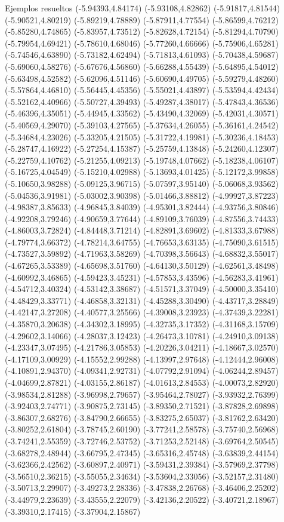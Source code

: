 \documentclass[11pt,a4paper]{article}
\begin{document}
\begin{fmex}{Ejemplos resueltos}
(-5.94393,4.84174) (-5.93108,4.82862) (-5.91817,4.81544) (-5.90521,4.80219) (-5.89219,4.78889) (-5.87911,4.77554) (-5.86599,4.76212) (-5.85280,4.74865) (-5.83957,4.73512) (-5.82628,4.72154) (-5.81294,4.70790) (-5.79954,4.69421) (-5.78610,4.68046) (-5.77260,4.66666) (-5.75906,4.65281) (-5.74546,4.63890) (-5.73182,4.62494) (-5.71813,4.61093) (-5.70438,4.59687) (-5.69060,4.58276) (-5.67676,4.56860) (-5.66288,4.55439) (-5.64895,4.54012) (-5.63498,4.52582) (-5.62096,4.51146) (-5.60690,4.49705) (-5.59279,4.48260) (-5.57864,4.46810) (-5.56445,4.45356) (-5.55021,4.43897) (-5.53594,4.42434) (-5.52162,4.40966) (-5.50727,4.39493) (-5.49287,4.38017) (-5.47843,4.36536) (-5.46396,4.35051) (-5.44945,4.33562) (-5.43490,4.32069) (-5.42031,4.30571) (-5.40569,4.29070) (-5.39103,4.27565) (-5.37634,4.26055) (-5.36161,4.24542) (-5.34684,4.23026) (-5.33205,4.21505) (-5.31722,4.19981) (-5.30236,4.18453) (-5.28747,4.16922) (-5.27254,4.15387) (-5.25759,4.13848) (-5.24260,4.12307) (-5.22759,4.10762) (-5.21255,4.09213) (-5.19748,4.07662) (-5.18238,4.06107) (-5.16725,4.04549) (-5.15210,4.02988) (-5.13693,4.01425) (-5.12172,3.99858) (-5.10650,3.98288) (-5.09125,3.96715) (-5.07597,3.95140) (-5.06068,3.93562) (-5.04536,3.91981) (-5.03002,3.90398) (-5.01466,3.88812) (-4.99927,3.87223) (-4.98387,3.85633) (-4.96845,3.84039) (-4.95301,3.82444) (-4.93756,3.80846) (-4.92208,3.79246) (-4.90659,3.77644) (-4.89109,3.76039) (-4.87556,3.74433) (-4.86003,3.72824) (-4.84448,3.71214) (-4.82891,3.69602) (-4.81333,3.67988) (-4.79774,3.66372) (-4.78214,3.64755) (-4.76653,3.63135) (-4.75090,3.61515) (-4.73527,3.59892) (-4.71963,3.58269) (-4.70398,3.56643) (-4.68832,3.55017) (-4.67265,3.53389) (-4.65698,3.51760) (-4.64130,3.50129) (-4.62561,3.48498) (-4.60992,3.46865) (-4.59423,3.45231) (-4.57853,3.43596) (-4.56283,3.41961) (-4.54712,3.40324) (-4.53142,3.38687) (-4.51571,3.37049) (-4.50000,3.35410) (-4.48429,3.33771) (-4.46858,3.32131) (-4.45288,3.30490) (-4.43717,3.28849) (-4.42147,3.27208) (-4.40577,3.25566) (-4.39008,3.23923) (-4.37439,3.22281) (-4.35870,3.20638) (-4.34302,3.18995) (-4.32735,3.17352) (-4.31168,3.15709) (-4.29602,3.14066) (-4.28037,3.12423) (-4.26473,3.10781) (-4.24910,3.09138) (-4.23347,3.07495) (-4.21786,3.05853) (-4.20226,3.04211) (-4.18667,3.02570) (-4.17109,3.00929) (-4.15552,2.99288) (-4.13997,2.97648) (-4.12444,2.96008) (-4.10891,2.94370) (-4.09341,2.92731) (-4.07792,2.91094) (-4.06244,2.89457) (-4.04699,2.87821) (-4.03155,2.86187) (-4.01613,2.84553) (-4.00073,2.82920) (-3.98534,2.81288) (-3.96998,2.79657) (-3.95464,2.78027) (-3.93932,2.76399) (-3.92403,2.74771) (-3.90875,2.73145) (-3.89350,2.71521) (-3.87828,2.69898) (-3.86307,2.68276) (-3.84790,2.66655) (-3.83275,2.65037) (-3.81762,2.63420) (-3.80252,2.61804) (-3.78745,2.60190) (-3.77241,2.58578) (-3.75740,2.56968) (-3.74241,2.55359) (-3.72746,2.53752) (-3.71253,2.52148) (-3.69764,2.50545) (-3.68278,2.48944) (-3.66795,2.47345) (-3.65316,2.45748) (-3.63839,2.44154) (-3.62366,2.42562) (-3.60897,2.40971) (-3.59431,2.39384) (-3.57969,2.37798) (-3.56510,2.36215) (-3.55055,2.34634) (-3.53604,2.33056) (-3.52157,2.31480) (-3.50713,2.29907) (-3.49273,2.28336) (-3.47838,2.26768) (-3.46406,2.25202) (-3.44979,2.23639) (-3.43555,2.22079) (-3.42136,2.20522) (-3.40721,2.18967) (-3.39310,2.17415) (-3.37904,2.15867) 
\end{fmex}
\end{document}
